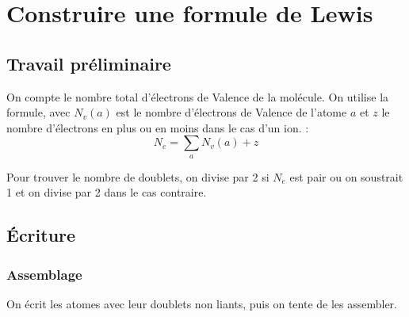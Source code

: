 \documentclass[french]{yLectureNote}
\begin{document}
%
%
%
\section{Construire une formule de Lewis}
\subsection{Travail préliminaire}
On compte le nombre total d'électrons de Valence de la molécule. On utilise la formule, avec $N_v(a)$ est le nombre d'électrons de Valence de l'atome $a$ et $z$ le nombre d'électrons en plus ou en moins dans le cas d'un ion. :
\[N_e = \sum_a N_v(a)+z\]

Pour trouver le nombre de doublets, on divise par 2 si $N_e$ est pair ou on soustrait 1 et on divise par 2 dans le cas contraire.
\subsection{Écriture}
\subsubsection{Assemblage}
On écrit les atomes avec leur doublets non liants, puis on tente de les assembler.
\end{document}
